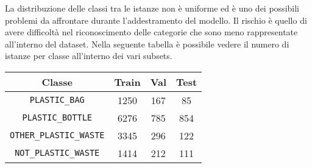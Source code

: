 La distribuzione delle classi tra le istanze non è uniforme ed è uno dei possibili problemi da affrontare durante l'addestramento del modello.
Il rischio è quello di avere difficoltà nel riconoscimento delle categorie che sono meno rappresentate all'interno del dataset.
Nella seguente tabella è possibile vedere il numero di istanze per classe all'interno dei vari subsets.

\begin{center}
    \begin{tabular}{ |c|c|c|c| } 
    \hline
    \textbf{Classe} & \textbf{Train} & \textbf{Val} & \textbf{Test} \\ 
    \hline
    \verb+PLASTIC_BAG+ & 1250 & 167 & 85 \\ 
    \verb+PLASTIC_BOTTLE+ & 6276 & 785 & 854 \\ 
    \verb+OTHER_PLASTIC_WASTE+ & 3345 & 296 & 122 \\ 
    \verb+NOT_PLASTIC_WASTE+ & 1414 & 212 & 111 \\
    \hline
    \end{tabular}
\end{center}
